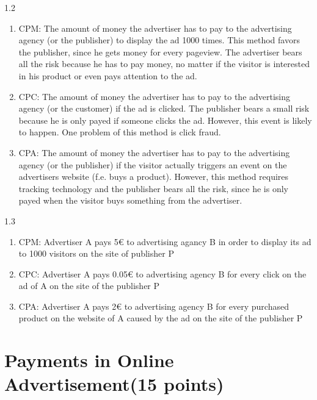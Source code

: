 \documentclass{WeSTassignment}
\begin{document}
1.2
\begin{enumerate}
	\item CPM: The amount of money the advertiser has to pay to the advertising agency (or the publisher) to display the ad 1000 times. This method favors the publisher, since he gets money for every pageview. The advertiser bears all the risk because he has to pay money, no matter if the visitor is interested in his product or even pays attention to the ad. 
	\item CPC: The amount of money the advertiser has to pay to the advertising agency (or the customer) if the ad is clicked. The publisher bears a small risk because he is only payed if someone clicks the ad. However, this event is likely to happen. One problem of this method is click fraud.  
	\item CPA: The amount of money the advertiser has to pay to the advertising agency (or the publisher) if the visitor actually triggers an event on the advertisers website (f.e. buys a product). However, this method requires tracking technology and the publisher bears all the risk, since he is only payed when the visitor buys something from the advertiser. 
\end{enumerate}

1.3
\begin{enumerate}
	\item CPM: Advertiser A pays 5€ to advertising agancy B in order to display its ad to 1000 visitors on the site of publisher P  
	\item CPC: Advertiser A pays 0.05€ to advertising agency B for every click on the ad of A on the site of the publisher P
	\item CPA: Advertiser A pays 2€  to advertising agency B for every purchased product on the website of A caused by the ad on the site of the publisher P
\end{enumerate}


\section{Payments in Online Advertisement(15 points)}
\end{document}
